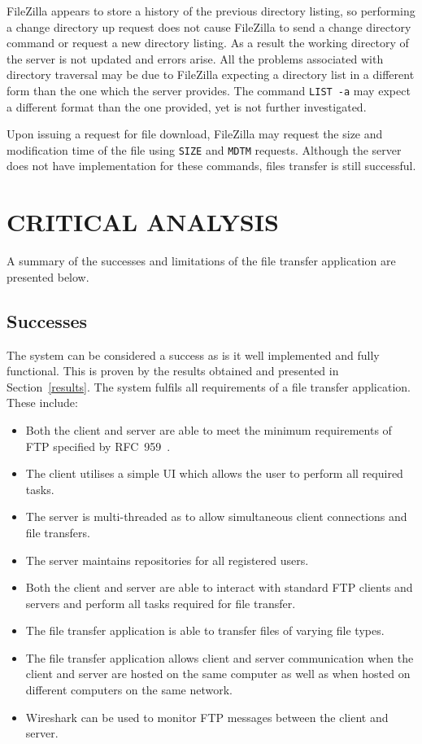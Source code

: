 \documentclass[10pt,twocolumn]{witseiepaper}
\begin{document}
FileZilla appears to store a history of the previous directory listing, so performing a change directory up request does not cause FileZilla to send a change directory command or request a new directory listing. As a result the working directory of the server is not updated and errors arise. All the problems associated with directory traversal may be due to FileZilla expecting a directory list in a different form than the one which the server provides. The command \texttt{LIST~-a} may expect a different format than the one provided, yet is not further investigated.

Upon issuing a request for file download, FileZilla may request the size and modification time of the file using \texttt{SIZE} and \texttt{MDTM} requests. Although the server does not have implementation for these commands, files transfer is still successful.

\section{CRITICAL ANALYSIS}

A summary of the successes and limitations of the file transfer application are presented below.

\subsection{Successes}

The system can be considered a success as is it well implemented and fully functional. This is proven by the results obtained and presented in Section~\ref{results}. The system fulfils all requirements of a file transfer application. These include:

\vspace*{-10mm}
\begin{itemize}
	\item Both the client and server are able to meet the minimum requirements of FTP specified by RFC~959~\cite{rfc959}.
	\item The client utilises a simple UI which allows the user to perform all required tasks.
	\item The server is multi-threaded as to allow simultaneous client connections and file transfers.
	\item The server maintains repositories for all registered users.
	\item Both the client and server are able to interact with standard FTP clients and servers and perform all tasks required for file transfer.
	\item The file transfer application is able to transfer files of varying file types.
	\item The file transfer application allows client and server communication when the client and server are hosted on the same computer as well as when hosted on different computers on the same network.
	\item Wireshark can be used to monitor FTP messages between the client and server. 
\end{itemize} 
\vspace*{-10mm}
\end{document}
